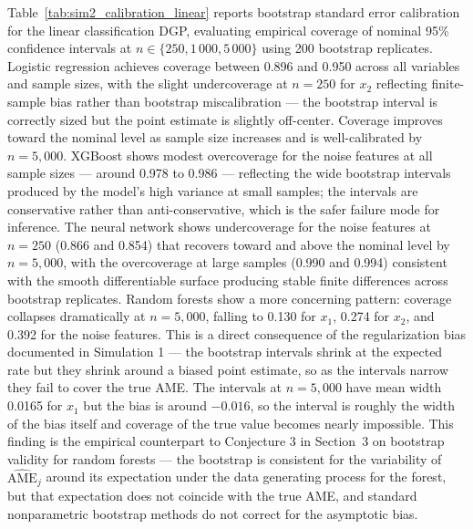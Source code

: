 \documentclass[12pt]{article}
\begin{document}
	Table~\ref{tab:sim2_calibration_linear} reports bootstrap standard error calibration for the linear classification DGP, evaluating empirical coverage of nominal 95\% confidence intervals at $n \in \{250, 1{\,}000, 5{\,}000\}$ using 200 bootstrap replicates. Logistic regression achieves coverage between 0.896 and 0.950 across all variables and sample sizes, with the slight undercoverage at $n=250$ for $x_2$ reflecting finite-sample bias rather than bootstrap miscalibration --- the bootstrap interval is correctly sized but the point estimate is slightly off-center. Coverage improves toward the nominal level as sample size increases and is well-calibrated by $n=5{,}000$. XGBoost shows modest overcoverage for the noise features at all sample sizes --- around 0.978 to 0.986 --- reflecting the wide bootstrap intervals produced by the model's high variance at small samples; the intervals are conservative rather than anti-conservative, which is the safer failure mode for inference. The neural network shows undercoverage for the noise features at $n=250$ (0.866 and 0.854) that recovers toward and above the nominal level by $n=5{,}000$, with the overcoverage at large samples (0.990 and 0.994) consistent with the smooth differentiable surface producing stable finite differences across bootstrap replicates. Random forests show a more concerning pattern: coverage collapses dramatically at $n=5{,}000$, falling to 0.130 for $x_1$, 0.274 for $x_2$, and 0.392 for the noise features. This is a direct consequence of the regularization bias documented in Simulation 1 --- the bootstrap intervals shrink at the expected rate but they shrink around a biased point estimate, so as the intervals narrow they fail to cover the true AME. The intervals at $n=5{,}000$ have mean width 0.0165 for $x_1$ but the bias is around $-0.016$, so the interval is roughly the width of the bias itself and coverage of the true value becomes nearly impossible. This finding is the empirical counterpart to Conjecture 3 in Section~3 on bootstrap validity for random forests --- the bootstrap is consistent for the variability of $\widehat{\mathrm{AME}}_j$ around its expectation under the data generating process for the forest, but that expectation does not coincide with the true AME, and standard nonparametric bootstrap methods do not correct for the asymptotic bias.
	
\end{document}
